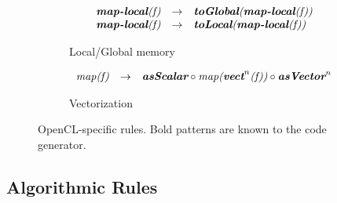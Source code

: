 \begin{figure}[t]
\vspace{\ruleSpace}
\begin{subfigure}[b]{1\linewidth}
\begin{mdframed}
\vspace{.2em}
$$
\begin{array}{lrl}
  \textit{\textbf{map-local}(f)} & \rightarrow & \textit{\textbf{toGlobal}(\textbf{map-local}(f))}\\  
  \textit{\textbf{map-local}(f)} & \rightarrow & \textit{\textbf{toLocal}(\textbf{map-local}(f))}\\  
\end{array}
$$
\end{mdframed}
  \caption{Local/Global memory}
  \label{fig:low:mem}
\end{subfigure}

\vspace{\ruleSpace}
\begin{subfigure}[b]{1\linewidth}
\begin{mdframed}
\vspace{-.75em}
$$
\begin{array}{lrll}
\textit{map(f)} & \rightarrow & \textit{\textbf{asScalar}} \circ \textit{map(\textbf{vect}}^n\textit{(f))} \circ \textit{\textbf{asVector}}^n
\end{array}
$$
\end{mdframed}
  \caption{Vectorization}
   \label{fig:algo:vect}
\end{subfigure}

\vspace{-2em}
\caption{OpenCL-specific rules. Bold patterns are known to the code generator.}
\label{fig:low}
\end{figure}




\subsection{Algorithmic Rules}

\newcommand{\Reduce}{\text{\textit{reduce}}\xspace}
\newcommand{\PartRed}{\text{\textit{part-red}}\xspace}
\newcommand{\RedSeq}{\text{\textit{reduce-seq}}\xspace}
\newcommand{\Map}{\text{\textit{map}}\xspace}
\newcommand{\MapSeq}{\text{\textit{map-seq}}\xspace}
\newcommand{\MyJoin}{\text{\textit{join}}\xspace}
\newcommand{\MySplit}[1]{\text{\textit{split}}^{#1}\xspace}

